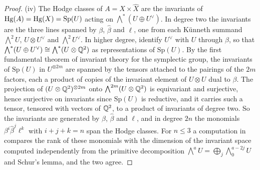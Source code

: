 \begin{proof}
(iv) The Hodge classes of $A=X\times\widehat{X}$ are the invariants of
$\operatorname{Hg}(A)=\operatorname{Hg}(X)=\mathrm{Sp}(U)$ acting on
$\bigwedge^{*}(U\oplus U^{\vee})$. In degree two the invariants are the three
lines spanned by $\beta$, $\widehat{\beta}$ and $\ell$, one from each
K\"unneth summand $\bigwedge^{2}U$, $U\otimes U^{\vee}$ and
$\bigwedge^{2}U^{\vee}$. In higher degree, identify $U^{\vee}$ with $U$
through $\beta$, so that $\bigwedge^{*}(U\oplus U^{\vee})\cong
\bigwedge^{*}(U\otimes\mathbb{Q}^{2})$ as representations of $\mathrm{Sp}(U)$. By the
first fundamental theorem of invariant theory for the symplectic group, the
invariants of $\mathrm{Sp}(U)$ in $U^{\otimes2m}$ are spanned by the tensors
attached to the pairings of the $2m$ factors, each a product of copies of the
invariant element of $U\otimes U$ dual to $\beta$. The projection of
$(U\otimes\mathbb{Q}^{2})^{\otimes2m}$ onto $\bigwedge^{2m}(U\otimes\mathbb{Q}^{2})$ is
equivariant and surjective, hence surjective on invariants since
$\mathrm{Sp}(U)$ is reductive, and it carries such a tensor, tensored with
vectors of $\mathbb{Q}^{2}$, to a product of invariants of degree two. So the
invariants are generated by $\beta$, $\widehat{\beta}$ and $\ell$, and in
degree $2n$ the monomials $\beta^{i}\widehat{\beta}^{j}\ell^{k}$ with
$i+j+k=n$ span the Hodge classes. For $n\le3$ a computation in \cite{BMB26} compares the rank of these monomials with the
dimension of the invariant space computed independently from the primitive
decomposition $\bigwedge^{a}U=\bigoplus_{j}\bigwedge^{a-2j}_{0}U$ and Schur's
lemma, and the two agree.
\end{proof}

